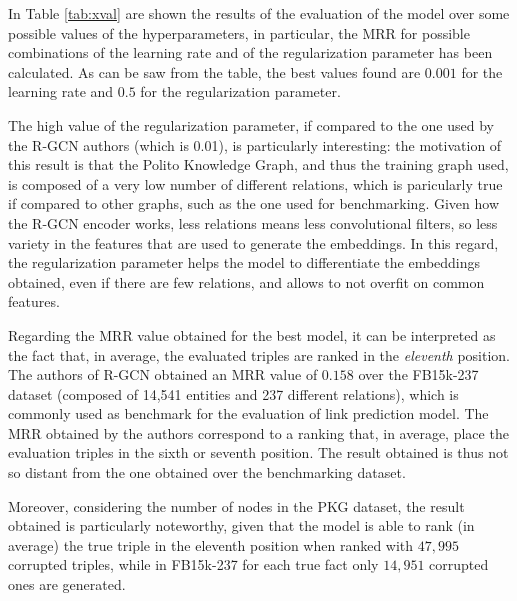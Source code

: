 \documentclass[%
    corpo=13.5pt,
    twoside,
    oldstyle,
    tipotesi=magistrale,
    greek,
    evenboxes
]{toptesi}
\begin{document}
In Table \ref{tab:xval} are shown the results of the evaluation of the model over
some possible values of the hyperparameters, in particular, the
MRR for possible combinations of the learning rate and of the regularization
parameter has been calculated.
As can be saw from the table, the best values found are $0.001$ for the
learning rate and $0.5$ for the regularization parameter.

The high value of the regularization parameter, if compared to the one
used by the R-GCN authors (which is 0.01), is particularly interesting:
the motivation of this result is that the
Polito Knowledge Graph, and thus the training graph used, is composed of a very
low number of different relations, which is
paricularly true if compared to other graphs, such as the one used
for benchmarking.
Given how the R-GCN encoder works, less relations means less convolutional
filters, so less variety in the features that are used to generate
the embeddings.
In this regard, the regularization parameter helps the model to differentiate
the embeddings obtained, even if there are few relations, and allows to
not overfit on common features.

Regarding the MRR value obtained for the best model, it can be interpreted as
the fact that, in average, the evaluated triples are ranked in the
\emph{eleventh} position.
The authors of R-GCN obtained an MRR value of $0.158$ over the FB15k-237
dataset (composed of 14,541 entities and 237 different relations), which is
commonly used as benchmark for the evaluation of link prediction model.
The MRR obtained by the authors correspond to a ranking that, in average,
place the evaluation triples in the sixth or seventh position. The result
obtained is thus not so distant from the one obtained over the benchmarking dataset.

Moreover, considering the number of nodes in the PKG dataset, the result
obtained is particularly noteworthy, given that the model is able to rank
(in average) the true triple in the eleventh position when ranked with $47,995$
corrupted triples, while in FB15k-237 for each true fact only
$14,951$ corrupted ones are generated.
\end{document}

